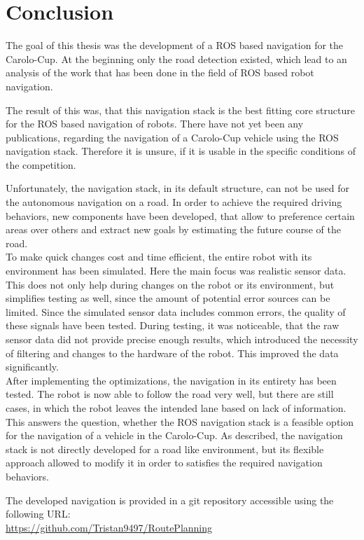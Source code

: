 \chapter{Conclusion}
\label{Conclusion}
The goal of this thesis was the development of a ROS based navigation for the Carolo-Cup. At the beginning only the road detection existed, which lead to an analysis of the work that has been done in the field of ROS based robot navigation.

The result of this was, that this navigation stack is the best fitting core structure for the ROS based navigation of robots. There have not yet been any publications, regarding the navigation of a Carolo-Cup vehicle using the ROS navigation stack. Therefore it is unsure, if it is usable in the specific conditions of the competition.

Unfortunately, the navigation stack, in its default structure, can not be used for the autonomous navigation on a road. In order to achieve the required driving behaviors, new components have been developed, that allow to preference certain areas over others and extract new goals by estimating the future course of the road.\\

To make quick changes cost and time efficient, the entire robot with its environment has been simulated. Here the main focus was realistic sensor data. This does not only help during changes on the robot or its environment, but simplifies testing as well, since the amount of potential error sources can be limited. Since the simulated sensor data includes common errors, the quality of these signals have been tested.
During testing, it was noticeable, that the raw sensor data did not provide precise enough results, which introduced the necessity of filtering and changes to the hardware of the robot. This improved the data significantly.\\

After implementing the optimizations, the navigation in its entirety has been tested. The robot is now able to follow the road very well, but there are still cases, in which the robot leaves the intended lane based on lack of information.\\

This answers the question, whether the ROS navigation stack is a feasible option for the navigation of a vehicle in the Carolo-Cup. 
As described, the navigation stack is not directly developed for a road like environment, but its flexible approach allowed to modify it in order to satisfies the required navigation behaviors.

The developed navigation is provided in a git repository accessible using the following URL:\\
\url{https://github.com/Tristan9497/RoutePlanning}
